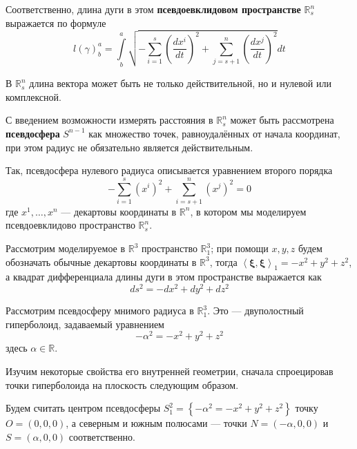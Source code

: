 \documentclass{article}
\numberwithin{equation}{section}
\newcommand{\neword}[1]{\textbf{#1}}
\newcommand{\scalmult}[2]{{\left \langle #1 \right \rangle}_{#2}}
\renewcommand{\vec}{\mathbf}
\begin{document}
Соответственно, длина дуги в этом \neword{псевдоевклидовом
  пространстве} $\mathbb{R}^n_s$ выражается по формуле
\begin{equation*}
  l(\gamma)^a_b = \int \limits^a_b {\sqrt{-\sum_{i=1}^s
      {\left (\frac{dx^i}{dt} \right )}^2 + \sum_{j=s+1}^n
      {\left (\frac{dx^j}{dt} \right )}^2}dt}
\end{equation*}

В $\mathbb{R}^n_s$ длина вектора может быть не только действительной,
но и нулевой или комплексной.

С введением возможности измерять расстояния в $\mathbb{R}^n_s$ может
быть рассмотрена \neword{псевдосфера} $S^{n-1}$ как множество точек,
равноудалённых от начала координат, при этом радиус не обязательно
является действительным.

Так, псевдосфера нулевого радиуса описывается уравнением второго порядка
\begin{equation*}
  -\sum_{i=1}^s\left (x^i \right)^2 + \sum_{i=s+1}^n\left(x^j \right)^2 = 0  
\end{equation*}
где $x^1, \dotsc, x^n $ — декартовы координаты в $\mathbb{R}^n$, в
котором мы моделируем псевдоевклидово пространство $\mathbb{R}^n_s$.

Рассмотрим моделируемое в $\mathbb{R}^3$ пространство
$\mathbb{R}^3_1$; при помощи $x, y, z$ будем обозначать обычные
декартовы координаты в $\mathbb{R}^3$, тогда
\mbox{$\scalmult{\vec{\xi}, \vec{\xi}}{1} = -x^2 + y^2 + z^2$}, а
квадрат дифференциала длины дуги в этом пространстве выражается как
\begin{equation}\label{eq:R^3_1-linear-element}
  ds^2 = -dx^2 + dy^2 + dz^2
\end{equation}

Рассмотрим псевдосферу мнимого радиуса в $\mathbb{R}^3_1$. Это —
двуполостный гиперболоид, задаваемый уравнением
\begin{equation}\label{eq:pseudosphere}
  -\alpha^2 = -x^2 +y^2 + z^2
\end{equation}
здесь $\alpha \in \mathbb{R}$.

Изучим некоторые свойства его внутренней геометрии, сначала
спроецировав точки гиперболоида на плоскость следующим образом.

Будем считать центром псевдосферы $S^2_1=\left \{-\alpha^2 = -x^2 + y^2 +
  z^2\right \}$ точку $O=(0, 0, 0)$, а северным и южным полюсами — точки
$N=(-\alpha, 0, 0)$ и $S=(\alpha, 0, 0)$ соответственно.


\end{document}
